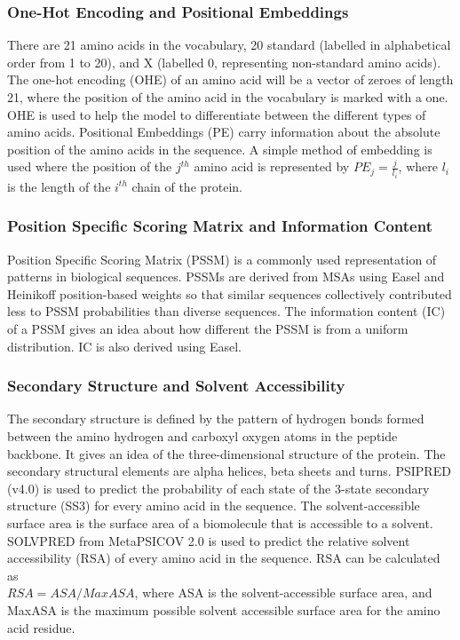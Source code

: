 \documentclass[journal=jacsat,manuscript=article]{achemso}
\begin{document}
\subsubsection{One-Hot Encoding and Positional Embeddings}
\quad There are 21 amino acids in the vocabulary, 20 standard (labelled in alphabetical order from 1 to 20), and X (labelled 0, representing non-standard amino acids). The one-hot encoding (OHE) of an amino acid will be a vector of zeroes of length 21, where the position of the amino acid in the vocabulary is marked with a one. OHE is used to help the model to differentiate between the different types of amino acids. Positional Embeddings (PE) carry information about the absolute position of the amino acids in the sequence. A simple method of embedding is used where the position of the $j^{th}$ amino acid is represented by ${PE}_{j} = \frac{j}{l_i}$, where $l_i$ is the length of the $i^{th}$ chain of the protein.

\subsubsection{Position Specific Scoring Matrix and Information Content}
\quad Position Specific Scoring Matrix (PSSM) is a commonly used representation of patterns in biological sequences. PSSMs are derived from MSAs using Easel \cite{potter2018hmmer} and Heinikoff position-based weights so that similar sequences collectively contributed less to PSSM probabilities than diverse sequences. The information content (IC) of a PSSM gives an idea about how different the PSSM is from a uniform distribution. IC is also derived using Easel.

\subsubsection{Secondary Structure and Solvent Accessibility}
\quad The secondary structure is defined by the pattern of hydrogen bonds formed between the amino hydrogen and carboxyl oxygen atoms in the peptide backbone. It gives an idea of the three-dimensional structure of the protein. The secondary structural elements are alpha helices, beta sheets and turns. PSIPRED (v4.0) \cite{jones1999protein} is used to predict the probability of each state of the 3-state secondary structure (SS3) for every amino acid in the sequence. The solvent-accessible surface area is the surface area of a biomolecule that is accessible to a solvent. SOLVPRED from MetaPSICOV 2.0\cite{jones2015metapsicov} is used to predict the relative solvent accessibility (RSA) of every amino acid in the sequence. RSA can be calculated as \\ ${RSA} = {ASA} / {MaxASA}$, where ASA is the solvent-accessible surface area, and MaxASA is the maximum possible solvent accessible surface area for the amino acid residue.
\end{document}
